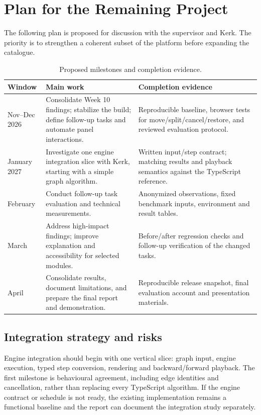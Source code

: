 \documentclass[11pt,a4paper]{article}
\newcommand{\page}{\par\vspace{8pt}}
\begin{document}
\page
\section{Plan for the Remaining Project}
The following plan is proposed for discussion with the supervisor and Kerk. The priority is to strengthen a coherent subset of the platform before expanding the catalogue.

\begin{table}[tbp]\small\centering
\caption{Proposed milestones and completion evidence.}\label{tab:plan}
\begin{tabularx}{\linewidth}{@{}p{20mm}p{48mm}X@{}}\toprule
Window & Main work & Completion evidence\\\midrule
Nov--Dec 2026 & Consolidate Week 10 findings; stabilize the build; define follow-up tasks and automate panel interactions. & Reproducible baseline, browser tests for move/split/cancel/restore, and reviewed evaluation protocol.\\
January 2027 & Investigate one engine integration slice with Kerk, starting with a simple graph algorithm. & Written input/step contract; matching results and playback semantics against the TypeScript reference.\\
February & Conduct follow-up task evaluation and technical measurements. & Anonymized observations, fixed benchmark inputs, environment and result tables.\\
March & Address high-impact findings; improve explanation and accessibility for selected modules. & Before/after regression checks and follow-up verification of the changed tasks.\\
April & Consolidate results, document limitations, and prepare the final report and demonstration. & Reproducible release snapshot, final evaluation account and presentation materials.\\\bottomrule
\end{tabularx}
\end{table}

\subsection{Integration strategy and risks}
Engine integration should begin with one vertical slice: graph input, engine execution, typed step conversion, rendering and backward/forward playback. The first milestone is behavioural agreement, including edge identities and cancellation, rather than replacing every TypeScript algorithm. If the engine contract or schedule is not ready, the existing implementation remains a functional baseline and the report can document the integration study separately.
\end{document}
